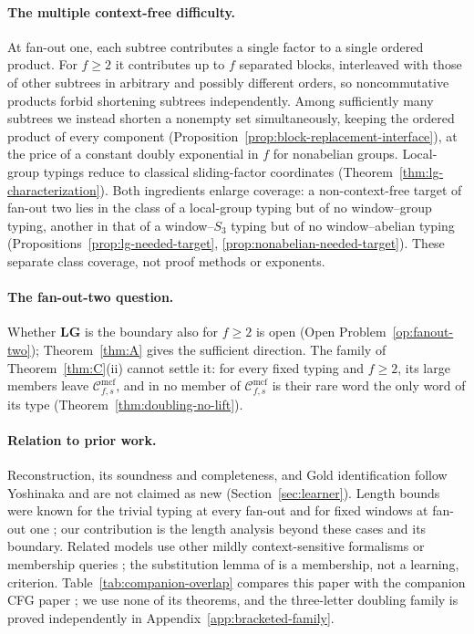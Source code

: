 \documentclass[11pt]{article}
\numberwithin{equation}{section}
\theoremstyle{plain}
\theoremstyle{definition}
\theoremstyle{remark}
\newcommand{\Cmcf}[2]{\mathcal{C}^{\mathrm{mcf}}_{#1,#2}}
\theoremstyle{plain}
\begin{document}
\paragraph{The multiple context-free difficulty.}
At fan-out one, each subtree contributes a single factor to a single ordered
product.  For $f\ge2$ it contributes up to $f$ separated blocks, interleaved with those of
other subtrees in arbitrary and possibly different orders, so noncommutative
products forbid shortening subtrees independently.  Among sufficiently many
subtrees we instead shorten a nonempty set simultaneously, keeping the
ordered product of every component
(Proposition~\ref{prop:block-replacement-interface}), at the price of a
constant doubly exponential in $f$ for nonabelian groups.  Local-group typings
reduce to classical sliding-factor coordinates
\cite{Straubing1985,Tilson1987,AlmeidaEtAl2009}
(Theorem~\ref{thm:lg-characterization}).  Both ingredients enlarge coverage: a
non-context-free target of fan-out two lies in the class of a local-group
typing but of no window--group typing, another in that of a window--$S_3$
typing but of no window--abelian typing
(Propositions~\ref{prop:lg-needed-target},
\ref{prop:nonabelian-needed-target}).  These separate class coverage, not
proof methods or exponents.

\paragraph{The fan-out-two question.}
Whether $\mathbf{LG}$ is the boundary also for $f\ge2$ is open (Open
Problem~\ref{op:fanout-two}); Theorem~\ref{thm:A} gives the sufficient
direction.  The family of Theorem~\ref{thm:C}(ii) cannot settle it: for every
fixed typing and $f\ge2$, its large members leave $\Cmcf{f}{s}$, and in no
member of $\Cmcf{f}{s}$ is their rare word the only word of its type
(Theorem~\ref{thm:doubling-no-lift}).

\paragraph{Relation to prior work.}
Reconstruction, its soundness and completeness, and Gold identification
follow Yoshinaka \cite{Yoshinaka2011,Yoshinaka2015General} and are not
claimed as new (Section~\ref{sec:learner}).  Length bounds were known for the
trivial typing at every fan-out \cite{Yoshinaka2011} and for fixed windows at
fan-out one \cite{Yoshinaka2008}; our contribution is the length analysis
beyond these cases and its boundary.  Related models use other mildly
context-sensitive formalisms \cite{OatesEtAl2006} or membership queries
\cite{Yoshinaka2010,ClarkYoshinaka2014,KanazawaYoshinaka2023}; the
substitution lemma of \cite{DuncanEtAl2026Substitution} is a membership, not
a learning, criterion.  Table~\ref{tab:companion-overlap} compares this paper
with the companion CFG paper \cite{kuriyamaCFG}; we use none of its theorems,
and the three-letter doubling family is proved independently in
Appendix~\ref{app:bracketed-family}.
\end{document}
